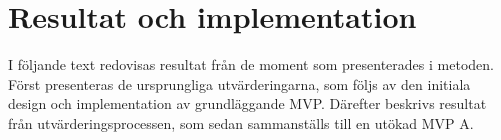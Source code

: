 


\newpage
\section{Resultat och implementation}
I följande text redovisas resultat från de moment som presenterades i metoden. Först presenteras de ursprungliga utvärderingarna, som följs av den initiala design och implementation av grundläggande MVP. Därefter beskrivs resultat från utvärderingsprocessen, som sedan sammanställs till en utökad MVP A.

